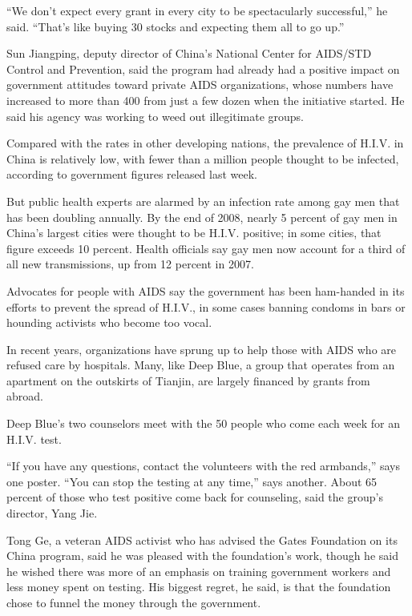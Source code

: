 ﻿\documentclass[12pt]{article}
\begin{document}
``We don't expect every grant in every city to be spectacularly successful,'' he said. ``That's like
buying 30 stocks and expecting them all to go up.''

Sun Jiangping, deputy director of China's National Center for AIDS/STD Control and Prevention, said
the program had already had a positive impact on government attitudes toward private AIDS
organizations, whose numbers have increased to more than 400 from just a few dozen when the
initiative started. He said his agency was working to weed out illegitimate groups.

Compared with the rates in other developing nations, the prevalence of H.I.V. in China is relatively
low, with fewer than a million people thought to be infected, according to government figures
released last week.

But public health experts are alarmed by an infection rate among gay men that has been doubling
annually. By the end of 2008, nearly 5 percent of gay men in China's largest cities were thought to
be H.I.V. positive; in some cities, that figure exceeds 10 percent. Health officials say gay men now
account for a third of all new transmissions, up from 12 percent in 2007.

Advocates for people with AIDS say the government has been ham-handed in its efforts to prevent the
spread of H.I.V., in some cases banning condoms in bars or hounding activists who become too vocal.

In recent years, organizations have sprung up to help those with AIDS who are refused care by
hospitals. Many, like Deep Blue, a group that operates from an apartment on the outskirts of
Tianjin, are largely financed by grants from abroad.

Deep Blue's two counselors meet with the 50 people who come each week for an H.I.V. test.

``If you have any questions, contact the volunteers with the red armbands,'' says one poster. ``You
can stop the testing at any time,'' says another. About 65 percent of those who test positive come
back for counseling, said the group's director, Yang Jie.

Tong Ge, a veteran AIDS activist who has advised the Gates Foundation on its China program, said he
was pleased with the foundation's work, though he said he wished there was more of an emphasis on
training government workers and less money spent on testing. His biggest regret, he said, is that
the foundation chose to funnel the money through the government.
\end{document}
